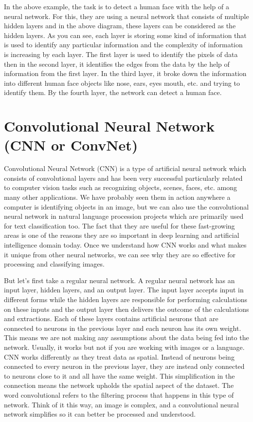 \par
In the above example, the task is to detect a human face with the help of a neural network. For this, they are using a neural network that consists of multiple hidden layers and in the above diagram, these layers can be considered as the hidden layers. As you can see, each layer is storing some kind of information that is used to identify any particular information and the complexity of information is increasing by each layer. The first layer is used to identify the pixels of data then in the second layer, it identifies the edges from the data by the help of information from the first layer. In the third layer, it broke down the information into different human face objects like nose, ears, eyes mouth, etc. and trying to identify them. By the fourth layer, the network can detect a human face.
\section{Convolutional Neural Network (CNN or ConvNet)}
Convolutional Neural Network (CNN) is a type of artificial neural network which consists of convolutional layers and has been very successful particularly related to computer vision tasks such as recognizing objects, scenes, faces, etc. among many other applications. We have probably seen them in action anywhere a computer is identifying objects in an image, but we can also use the convolutional neural network in natural language procession projects which are primarily used for text classification too. The fact that they are useful for these fast-growing areas is one of the reasons they are so important in deep learning and artificial intelligence domain today. Once we understand how CNN works and what makes it unique from other neural networks, we can see why they are so effective for processing and classifying images.
\newline
\par
But let's first take a regular neural network. A regular neural network has an input layer, hidden layers, and an output layer. The input layer accepts input in different forms while the hidden layers are responsible for performing calculations on these inputs and the output layer then delivers the outcome of the calculations and extractions. Each of these layers contains artificial neurons that are connected to neurons in the previous layer and each neuron has its own weight. This means we are not making any assumptions about the data being fed into the network. Usually, it works but not if you are working with images or a language. CNN works differently as they treat data as spatial. Instead of neurons being connected to every neuron in the previous layer, they are instead only connected to neurons close to it and all have the same weight. This simplification in the connection means the network upholds the spatial aspect of the dataset. The word convolutional refers to the filtering process that happens in this type of network. Think of it this way, an image is complex, and a convolutional neural network simplifies so it can better be processed and understood.
